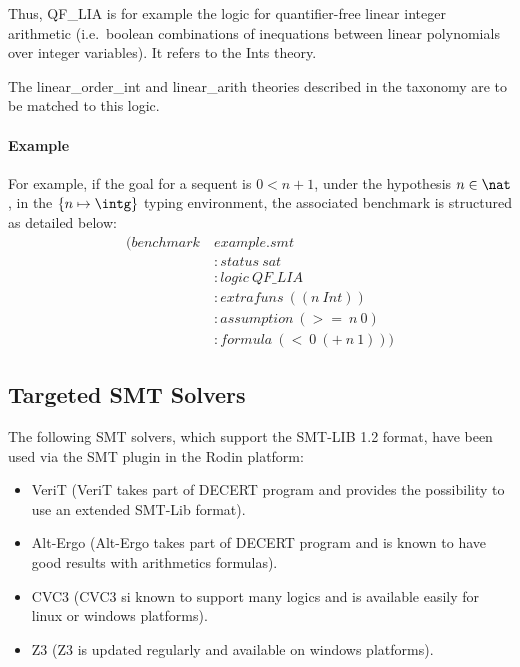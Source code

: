 Thus, QF\_LIA is for example the logic for quantifier-free linear integer arithmetic (i.e.\ boolean combinations of inequations between linear polynomials over integer variables). It refers to the Ints theory.

The linear\_order\_int and linear\_arith theories described in the taxonomy\cite{TAXO09} are to be matched to this logic. 

\paragraph{Example}
For example, if the goal for a sequent is $0 < n + 1$, under the hypothesis $n \in \nat$, in the $\{n \mapsto \intg\}$ typing environment, the associated benchmark is structured as detailed below:
\begin{align*}
(benchmark~&example.smt                      \\
           &:status~sat                      \\
           &:logic~QF\_LIA                   \\
           &:extrafuns~((n~Int))             \\
           &:assumption~(>=~n~0)             \\
           &:formula~(<~0~(+~n~1))) 
\end{align*}

\subsection{Targeted SMT Solvers}
The following SMT solvers, which support the SMT-LIB 1.2 format, have been used via the SMT plugin in the Rodin platform: 
\begin{itemize}
\item VeriT\cite{VERIT} (VeriT takes part of DECERT program and provides the possibility to use an extended SMT-Lib format).
\item Alt-Ergo\cite{ALTERGO} (Alt-Ergo takes part of DECERT program and is known to have good results with arithmetics formulas).
\item CVC3\cite{CVC3} (CVC3 si known to support many logics and is available easily for linux or windows platforms).
\item Z3\cite{Z3} (Z3 is updated regularly and available on windows platforms).
\end{itemize}

